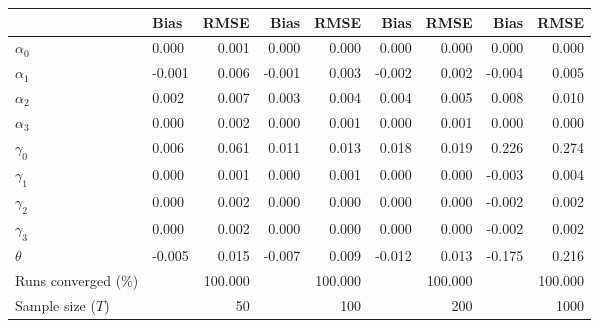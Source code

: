 
\begin{tabular}[t]{llrrrrrrr}
\toprule
  & Bias & RMSE & Bias & RMSE & Bias & RMSE & Bias & RMSE\\
\midrule
$\alpha_{0}$ & 0.000 & 0.001 & 0.000 & 0.000 & 0.000 & 0.000 & 0.000 & 0.000\\
$\alpha_{1}$ & -0.001 & 0.006 & -0.001 & 0.003 & -0.002 & 0.002 & -0.004 & 0.005\\
$\alpha_{2}$ & 0.002 & 0.007 & 0.003 & 0.004 & 0.004 & 0.005 & 0.008 & 0.010\\
$\alpha_{3}$ & 0.000 & 0.002 & 0.000 & 0.001 & 0.000 & 0.001 & 0.000 & 0.000\\
$\gamma_{0}$ & 0.006 & 0.061 & 0.011 & 0.013 & 0.018 & 0.019 & 0.226 & 0.274\\
$\gamma_{1}$ & 0.000 & 0.001 & 0.000 & 0.001 & 0.000 & 0.000 & -0.003 & 0.004\\
$\gamma_{2}$ & 0.000 & 0.002 & 0.000 & 0.000 & 0.000 & 0.000 & -0.002 & 0.002\\
$\gamma_{3}$ & 0.000 & 0.002 & 0.000 & 0.000 & 0.000 & 0.000 & -0.002 & 0.002\\
$\theta$ & -0.005 & 0.015 & -0.007 & 0.009 & -0.012 & 0.013 & -0.175 & 0.216\\
Runs converged (\%) &  & 100.000 &  & 100.000 &  & 100.000 &  & 100.000\\
Sample size ($T$) &  & 50 &  & 100 &  & 200 &  & 1000\\
\bottomrule
\end{tabular}
